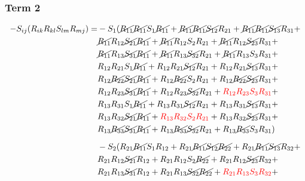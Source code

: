 \subsubsection{Term 2}
\begin{equation}
    \begin{split}
        -S_{ij}(R_{ik}R_{kl} S_{lm} R_{mj}) = &
            -S_{1}(
                \cancel{R_{11}}\cancel{R_{11}}S_{1}\cancel{R_{11}} + \cancel{R_{11}}\cancel{R_{11}}\cancel{S_{12}}R_{21} + \cancel{R_{11}}\cancel{R_{11}}\cancel{S_{13}}R_{31} +    \\
            &   \cancel{R_{11}}R_{12}\cancel{S_{21}}\cancel{R_{11}} + \cancel{R_{11}}R_{12}S_{2}R_{21} + \cancel{R_{11}}R_{12}\cancel{S_{23}}R_{31} +    \\
            &   \cancel{R_{11}}R_{13}\cancel{S_{31}}\cancel{R_{11}} + \cancel{R_{11}}R_{13}\cancel{S_{32}}R_{21} + \cancel{R_{11}}R_{13}S_{3}R_{31} +    \\
            &   R_{12}R_{21}S_{1}\cancel{R_{11}} + R_{12}R_{21}\cancel{S_{12}}R_{21} + R_{12}R_{21}\cancel{S_{13}}R_{31} +    \\
            &   R_{12}\cancel{R_{22}}\cancel{S_{21}}\cancel{R_{11}} + R_{12}\cancel{R_{22}}S_{2}R_{21} + R_{12}\cancel{R_{22}}\cancel{S_{23}}R_{31} +    \\
            &   R_{12}R_{23}\cancel{S_{31}}\cancel{R_{11}} + R_{12}R_{23}\cancel{S_{32}}R_{21} + {\color{red}R_{12}R_{23}S_{3}R_{31}} +    \\
            &   R_{13}R_{31}S_{1}\cancel{R_{11}} + R_{13}R_{31}\cancel{S_{12}}R_{21} + R_{13}R_{31}\cancel{S_{13}}R_{31} +    \\
            &   R_{13}R_{32}\cancel{S_{21}}\cancel{R_{11}} + {\color{red}R_{13}R_{32}S_{2}R_{21}} + R_{13}R_{32}\cancel{S_{23}}R_{31} +    \\
            &   R_{13}\cancel{R_{33}}\cancel{S_{31}}\cancel{R_{11}} + R_{13}\cancel{R_{33}}\cancel{S_{32}}R_{21} + R_{13}\cancel{R_{33}}S_{3}R_{31}
            )     \\[6pt]
            &   -S_{2}(
                R_{21}\cancel{R_{11}}S_{1}R_{12} +R_{21}\cancel{R_{11}}\cancel{S_{12}}\cancel{R_{22}} +R_{21}\cancel{R_{11}}\cancel{S_{13}}R_{32} +      \\
            &   R_{21}R_{12}\cancel{S_{21}}R_{12} +R_{21}R_{12}S_{2}\cancel{R_{22}} +R_{21}R_{12}\cancel{S_{23}}R_{32} +      \\
            &   R_{21}R_{13}\cancel{S_{31}}R_{12} +R_{21}R_{13}\cancel{S_{32}}\cancel{R_{22}} +{\color{red}R_{21}R_{13}S_{3}R_{32}} +      \\

\end{split}
\end{equation}
